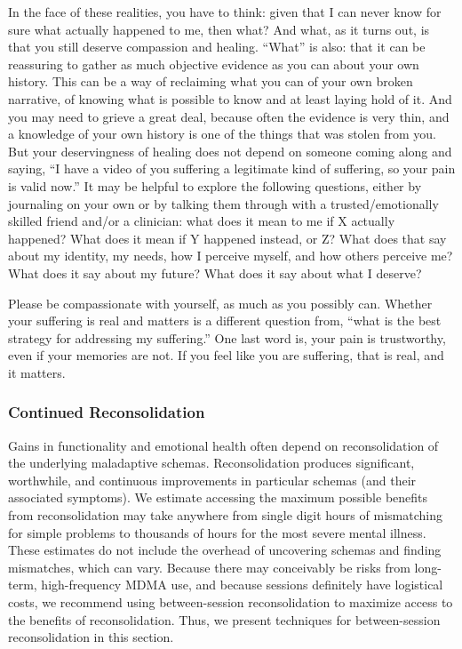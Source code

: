 \documentclass[12pt,letterpaper]{book}
\begin{document}
In the face of these realities, you have to think: given that I can never know for sure what actually happened to me, then what?  And what, as it turns out, is that you still deserve compassion and healing.  “What” is also: that it can be reassuring to gather as much objective evidence as you can about your own history. This can be a way of reclaiming what you can of your own broken narrative, of knowing what is possible to know and at least laying hold of it. And you may need to grieve a great deal, because often the evidence is very thin, and a knowledge of your own history is one of the things that was stolen from you. But your deservingness of healing does not depend on someone coming along and saying, “I have a video of you suffering a legitimate kind of suffering, so your pain is valid now.” It may be helpful to explore the following questions, either by journaling on your own or by talking them through with a trusted/emotionally skilled friend and/or a clinician: what does it mean to me if X actually happened? What does it mean if Y happened instead, or Z? What does that say about my identity, my needs, how I perceive myself, and how others perceive me? What does it say about my future? What does it say about what I deserve?

Please be compassionate with yourself, as much as you possibly can. Whether your suffering is real and matters is a different question from, “what is the best strategy for addressing my suffering.” One last word is, your pain is trustworthy, even if your memories are not. If you feel like you are suffering, that is real, and it matters.
\subsubsection{Continued Reconsolidation}
\label{sec:moreReconsolidation}
Gains in functionality and emotional health often depend on reconsolidation of the underlying maladaptive schemas. Reconsolidation produces significant, worthwhile, and continuous improvements in particular schemas (and their associated symptoms). We estimate accessing the maximum possible benefits from reconsolidation may take anywhere from single digit hours of mismatching for simple problems to thousands of hours for the most severe mental illness. These estimates do not include the overhead of uncovering schemas and finding mismatches, which can vary. Because there may conceivably be risks from long-term, high-frequency MDMA use, and because sessions definitely have logistical costs, we recommend using between-session reconsolidation to maximize access to the benefits of reconsolidation. Thus, we present techniques for between-session reconsolidation in this section.
\end{document}
